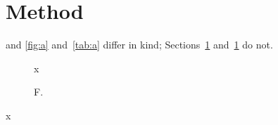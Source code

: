 \documentclass{article}
\begin{document}
\section{Method}\label{sec:method}
 and \autoref{fig:a} and~\autoref{tab:a} differ in kind; Sections~\ref{sec:method} and~\ref{fig:a} do not.
\begin{figure}x\caption{F.}\label{fig:a}\end{figure}
\begin{table}\caption{T.}\label{tab:a}x\end{table}
\end{document}
